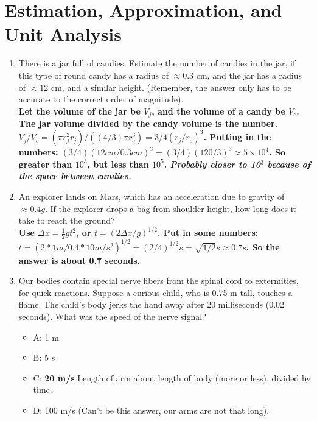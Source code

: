 \documentclass[10pt]{article}
\begin{document}
\maketitle

\section{Estimation, Approximation, and Unit Analysis}
\begin{enumerate}
\item There is a jar full of candies.  Estimate the number of candies in the jar, if this type of round candy has a radius of $\approx 0.3$ cm, and the jar has a radius of $\approx 12$ cm, and a similar height.  (Remember, the answer only has to be accurate to the correct order of magnitude).
\vspace{0.5 cm} \\
\textbf{Let the volume of the jar be $V_j$, and the volume of a candy be $V_c$.  The jar volume divided by the candy volume is the number.  $V_j / V_c = (\pi r_j^2 r_j)/((4/3)\pi r_c^3) = 3/4 (r_j/r_c)^3$.  Putting in the numbers: $(3/4)(12 cm/0.3 cm)^3 = (3/4)(120/3)^3 \approx 5 \times 10^4$.  So greater than $10^3$, but less than $10^5$. \textit{Probably closer to 10$^3$ because of the space between candies.}}
\vspace{0.4 cm}
\item An explorer lands on Mars, which has an acceleration due to gravity of $\approx 0.4 g$.  If the explorer drops a bag from shoulder height, how long does it take to reach the ground?
\vspace{0.5 cm} \\
\textbf{Use $\Delta x = \frac{1}{2}gt^2$, or $t = (2\Delta x/g)^{1/2}$.  Put in some numbers: $t = (2*1 m/0.4*10 m/s^2)^{1/2} = (2/4)^{1/2} s = \sqrt{1/2} s \approx 0.7 s$.  So the answer is about 0.7 seconds.}
\vspace{0.2 cm}
\item Our bodies contain special nerve fibers from the spinal cord to extermities, for quick reactions.  Suppose a curious child, who is 0.75 m tall, touches a flame.  The child's body jerks the hand away after 20 milliseconds (0.02 seconds).  What was the speed of the nerve signal? \\
\begin{itemize}
\item A: 1 m
\item B: 5 s
\item C: \textbf{20 m/s} Length of arm about length of body (more or less), divided by time.
\item D: 100 m/s (Can't be this answer, our arms are not that long).
\end{itemize}
\end{enumerate}
\end{document}
